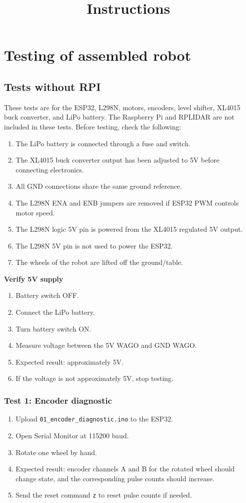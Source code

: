 \documentclass[12pt]{article}
\title{Instructions}
\begin{document}
\maketitle
\tableofcontents
\clearpage
\section{Testing of assembled robot}
\subsection{Tests without RPI}
These tests are for the ESP32, L298N, motors, encoders, level shifter, XL4015 buck converter, and LiPo battery. The Raspberry Pi and RPLIDAR are not included in these tests. Before testing, check the following:
\begin{enumerate}
    \item The LiPo battery is connected through a fuse and switch.
    \item The XL4015 buck converter output has been adjusted to 5V before connecting electronics.
    \item All GND connections share the same ground reference.
    \item The L298N ENA and ENB jumpers are removed if ESP32 PWM controls motor speed.
    \item The L298N logic 5V pin is powered from the XL4015 regulated 5V output.
    \item The L298N 5V pin is not used to power the ESP32.
    \item The wheels of the robot are lifted off the ground/table.
\end{enumerate}
\noindent\textbf{Verify 5V supply}
\begin{enumerate}
    \item Battery switch OFF.
    \item Connect the LiPo battery.
    \item Turn battery switch ON.
    \item Measure voltage between the 5V WAGO and GND WAGO.
    \item Expected result: approximately 5V.
    \item If the voltage is not approximately 5V, stop testing.
\end{enumerate}
\subsubsection{Test 1: Encoder diagnostic}
\begin{enumerate}
    \item Upload \texttt{01\_encoder\_diagnostic.ino} to the ESP32.
    \item Open Serial Monitor at 115200 baud.
    \item Rotate one wheel by hand.
    \item Expected result: encoder channels A and B for the rotated wheel should change state, and the corresponding pulse counts should increase.
    \item Send the reset command \texttt{z} to reset pulse counts if needed.
\end{enumerate}
\end{document}
